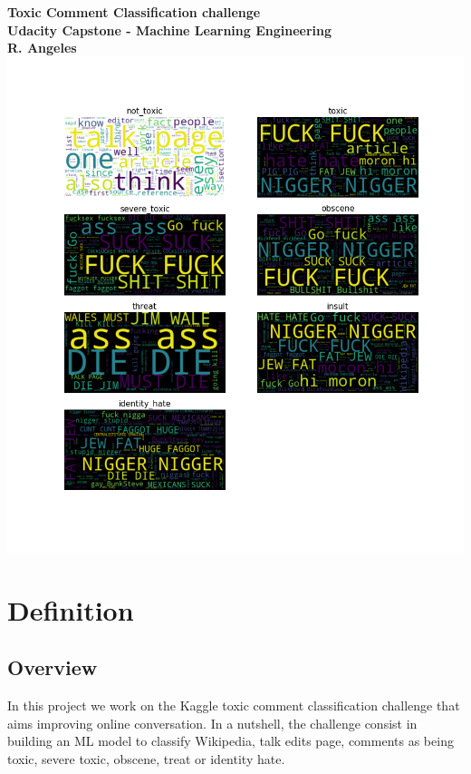 \documentclass{report}
\begin{document}
\begin{titlepage}
    \centering
    \vfill
    {\bfseries\Large
        Toxic Comment Classification challenge\\
         Udacity Capstone - Machine Learning Engineering\\
        \vskip1cm
        R. Angeles\\
    }    
    \vfill
    \includegraphics[width=15cm]{../local/plots_tables/clouds.png} %
    \vfill
    \vfill
\end{titlepage}




\chapter{Definition}

\section{Overview}

In this project we work on the Kaggle toxic comment classification challenge that aims improving 
online conversation. In a nutshell, the challenge consist in building an ML model to classify 
Wikipedia, talk edits page, comments as being toxic, severe toxic, obscene, treat or identity hate.
\end{document}
